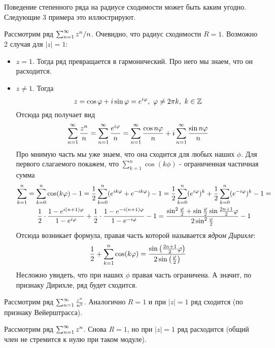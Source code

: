 \begin{note}
	Поведение степенного ряда на радиусе сходимости может быть каким угодно. Следующие 3 примера это иллюстрируют.
\end{note}

\begin{example}
	Рассмотрим ряд $\sum_{n = 1}^\infty z^n/n$. Очевидно, что радиус сходимости $R = 1$. Возможно 2 случая для $|z| = 1$:
	\begin{itemize}
		\item $z = 1$. Тогда ряд превращается в гармонический. Про него мы знаем, что он расходится.
		
		\item $z \neq 1$. Тогда
		\[
			z = \cos \varphi + i\sin \varphi = e^{i\varphi},\ \varphi \neq 2\pi k,\ k \in \mathbb{Z}
		\]
		Отсюда ряд получает вид
		\[
			\sum_{n = 1}^\infty \frac{z^n}{n} = \sum_{n = 1}^\infty \frac{e^{i\varphi}}{n} = \sum_{n = 1}^\infty \frac{\cos n\varphi}{n} + i\sum_{n = 1}^\infty \frac{\sin n\varphi}{n}
		\]
		Про мнимую часть мы уже знаем, что она сходится для любых наших $\phi$. Для первого слагаемого покажем, что $\sum_{k = 1}^n \cos (k\phi)$ - ограниченная частичная сумма
		\begin{multline*}
			\sum\limits_{k = 1}^n = \sum\limits_{k = 0}^n \cos (k\varphi) - 1 = \frac{1}{2}\sum\limits_{k = 0}^n (e^{ik\varphi} + e^{-ik\varphi}) - 1 = \frac{1}{2}\sum\limits_{k = 0}^n (e^{i\varphi})^k + \frac{1}{2}\sum\limits_{k = 0}^n(e^{-i\varphi})^k - 1 =
			\\
			\frac{1}{2} \cdot \frac{1 - e^{i(n + 1)\varphi}}{1 - e^{i\varphi}} + \frac{1}{2} \cdot \frac{1 - e^{-i(n + 1)\varphi}}{1 - e^{-i\varphi}} - 1 = \frac{\sin^2 \frac{\varphi}{2} + \sin \frac{\varphi}{2} \sin \frac{2n + 1}{2}\varphi}{2\sin^2 \frac{\varphi}{2}} - 1
 		\end{multline*}
 		Отсюда возникает формула, правая часть которой называется \textit{ядром Дирихле}:
 		\[
 			\frac{1}{2} + \sum\limits_{k = 1}^n \cos(k\varphi) = \frac{\sin\left(\frac{2n + 1}{2}\varphi\right)}{2\sin\left(\frac{\varphi}{2}\right)}
 		\]
 		Несложно увидеть, что при наших $\phi$ правая часть ограничена. А значит, по признаку Дирихле, ряд будет сходится.
	\end{itemize}
\end{example}

\begin{example}
	Рассмотрим ряд $\sum_{n = 1}^\infty \frac{z^n}{n^2}$. Аналогично $R = 1$ и при $|z| = 1$ ряд сходится (по признаку Вейерштрасса).
\end{example}

\begin{example}
	Рассмотрим ряд $\sum_{n = 1}^\infty z^n$. Снова $R = 1$, но при $|z| = 1$ ряд расходится (общий член не стремится к нулю при таком модуле).
\end{example}

